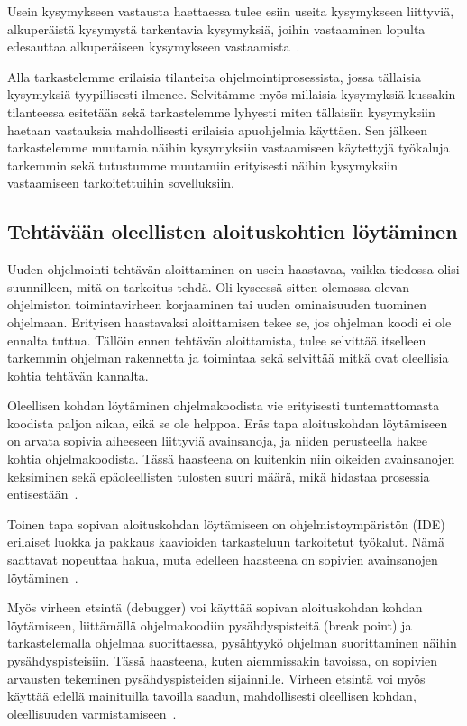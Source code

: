 \documentclass[finnish]{../tktltiki2}
\theoremstyle{definition}
\theoremstyle{remark}
\begin{document}
Usein kysymykseen vastausta haettaessa tulee esiin useita kysymykseen liittyviä, alkuperäistä kysymystä tarkentavia kysymyksiä, joihin vastaaminen lopulta edesauttaa alkuperäiseen kysymykseen vastaamista~\cite{questions-during-software-evolution-tasks}.

Alla tarkastelemme erilaisia tilanteita ohjelmointiprosessista, jossa tällaisia kysymyksiä tyypillisesti ilmenee. Selvitämme myös millaisia kysymyksiä kussakin tilanteessa esitetään sekä tarkastelemme lyhyesti miten tällaisiin kysymyksiin haetaan vastauksia mahdollisesti erilaisia apuohjelmia käyttäen. Sen jälkeen tarkastelemme muutamia näihin kysymyksiin vastaamiseen käytettyjä työkaluja tarkemmin sekä tutustumme muutamiin erityisesti näihin kysymyksiin vastaamiseen tarkoitettuihin sovelluksiin.

\subsection{Tehtävään oleellisten aloituskohtien löytäminen}
Uuden ohjelmointi tehtävän aloittaminen on usein haastavaa, vaikka tiedossa olisi suunnilleen, mitä on tarkoitus tehdä. Oli kyseessä sitten olemassa olevan ohjelmiston toimintavirheen korjaaminen tai uuden ominaisuuden tuominen ohjelmaan. Erityisen haastavaksi aloittamisen tekee se, jos ohjelman koodi ei ole ennalta tuttua. Tällöin ennen tehtävän aloittamista, tulee selvittää itselleen tarkemmin ohjelman rakennetta ja toimintaa sekä selvittää mitkä ovat oleellisia kohtia tehtävän kannalta.

Oleellisen kohdan löytäminen ohjelmakoodista vie erityisesti tuntemattomasta koodista paljon aikaa, eikä se ole helppoa.
Eräs tapa aloituskohdan löytämiseen on arvata sopivia aiheeseen liittyviä avainsanoja, ja niiden perusteella hakee kohtia ohjelmakoodista. Tässä haasteena on kuitenkin niin oikeiden avainsanojen keksiminen sekä epäoleellisten tulosten suuri määrä, mikä hidastaa prosessia entisestään~\cite{what-to-search-for}.

Toinen tapa sopivan aloituskohdan löytämiseen on ohjelmistoympäristön (IDE) erilaiset luokka ja pakkaus kaavioiden tarkasteluun tarkoitetut työkalut. Nämä saattavat nopeuttaa hakua, muta edelleen haasteena on sopivien avainsanojen löytäminen~\cite{what-to-search-for}.

Myös virheen etsintä (debugger) voi käyttää sopivan aloituskohdan kohdan löytämiseen, liittämällä ohjelmakoodiin pysähdyspisteitä (break point) ja tarkastelemalla ohjelmaa suorittaessa, pysähtyykö ohjelman suorittaminen näihin pysähdyspisteisiin. Tässä haasteena, kuten aiemmissakin tavoissa, on sopivien arvausten tekeminen pysähdyspisteiden sijainnille.
Virheen etsintä voi myös käyttää edellä mainituilla tavoilla saadun, mahdollisesti oleellisen kohdan, oleellisuuden varmistamiseen~\cite{eliciting-design-requirements-for-maintenance-oriented-ides}.
\end{document}
